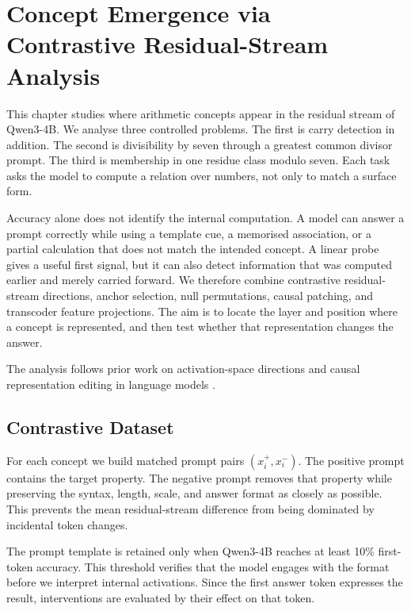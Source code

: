 \chapter{Concept Emergence via Contrastive Residual-Stream Analysis}
\label{sec:concept_localisation}

This chapter studies where arithmetic concepts appear in the residual stream of
Qwen3-4B. We analyse three controlled problems. The first is carry detection in
addition. The second is divisibility by seven through a greatest common divisor
prompt. The third is membership in one residue class modulo seven. Each task asks
the model to compute a relation over numbers, not only to match a surface form.

Accuracy alone does not identify the internal computation. A model can answer a
prompt correctly while using a template cue, a memorised association, or a partial
calculation that does not match the intended concept. A linear probe gives a
useful first signal, but it can also detect information that was computed earlier
and merely carried forward. We therefore combine contrastive residual-stream
directions, anchor selection, null permutations, causal patching, and transcoder
feature projections. The aim is to locate the layer and position where a concept
is represented, and then test whether that representation changes the answer.

The analysis follows prior work on activation-space directions and causal
representation editing in language models
\citep{zou2025representationengineeringtopdownapproach,
panickssery2024steeringllama2contrastive,
meng2023locatingeditingfactualassociations,fear2025physics}.

\section{Contrastive Dataset}
\label{sec:concept_pairs}

For each concept we build matched prompt pairs \((x_i^+,x_i^-)\). The positive
prompt contains the target property. The negative prompt removes that property
while preserving the syntax, length, scale, and answer format as closely as
possible. This prevents the mean residual-stream difference from being dominated
by incidental token changes.

The prompt template is retained only when Qwen3-4B reaches at least 10\%
first-token accuracy. This threshold verifies that the model engages with the
format before we interpret internal activations. Since the first answer token
expresses the result, interventions are evaluated by their effect on that token.

